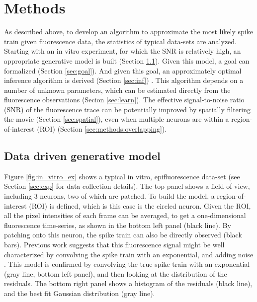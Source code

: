 \section{Methods} \label{sec:methods}

As described above, to develop an algorithm to approximate the most likely spike train given fluorescence data, the statistics of typical data-sets are analyzed.  Starting with an in vitro experiment, for which the SNR is relatively high, an appropriate generative model is built (Section \ref{sec:model}).  Given this model, a goal can formalized (Section \ref{sec:goal}).  And given this goal, an approximately optimal inference algorithm is derived (Section \ref{sec:inf}) .  This algorithm depends on a number of unknown parameters, which can be estimated directly from the fluorescence observations (Secion \ref{sec:learn}).  The effective signal-to-noise ratio (SNR) of the fluorescence trace can be potentially improved by spatially filtering the movie (Section \ref{sec:spatial}), even when multiple neurons are within a region-of-interest (ROI) (Section \ref{sec:methods:overlapping}).  


\subsection{Data driven generative model} \label{sec:model}

Figure \ref{fig:in_vitro_ex} shows a typical in vitro, epifluorescence data-set (see Section \ref{sec:exp} for data collection details).  The top panel shows a field-of-view, including 3 neurons, two of which are patched.  To build the model, a region-of-interest (ROI) is defined,  which is this case is the circled neuron.  Given the ROI, all the pixel intensities of each frame can be averaged, to get a one-dimensional fluorescence time-series, as shown in the bottom left panel (black line).  By patching onto this neuron, the spike train can also be directly observed (black bars). Previous work suggests that this fluorescence signal might be well characterized by convolving the spike train with an exponential, and adding noise \cite{ImagingManual}.  This model is confirmed by convolving the true spike train with an exponential (gray line, bottom left panel), and then looking at the distribution of the residuals.  The bottom right panel shows a histogram of the residuals (black line), and the best fit Gaussian distribution (gray line).


